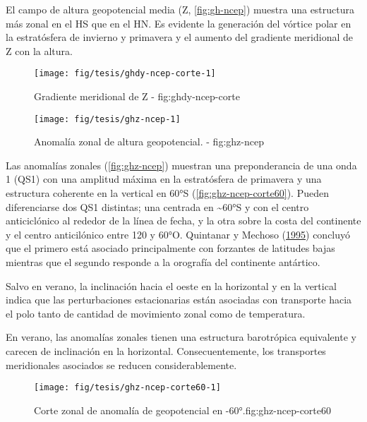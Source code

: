 \documentclass[spanish,a4paper]{book}
\begin{document}
El campo de altura geopotencial media (Z, \autoref{fig:gh-ncep}) muestra
una estructura más zonal en el HS que en el HN. Es evidente la
generación del vórtice polar en la estratósfera de invierno y primavera
y el aumento del gradiente meridional de Z con la altura.

\begin{figure}
\texttt{[image: fig/tesis/ghdy-ncep-corte-1]} \caption{Gradiente meridional de Z - fig:ghdy-ncep-corte}\label{fig:ghdy-ncep-corte}
\end{figure}

\begin{figure}

{\centering \texttt{[image: fig/tesis/ghz-ncep-1]} 

}

\caption{Anomalía zonal de altura geopotencial. - fig:ghz-ncep}\label{fig:ghz-ncep}
\end{figure}

Las anomalías zonales (\autoref{fig:ghz-ncep}) muestran una
preponderancia de una onda 1 (QS1) con una amplitud máxima en la
estratósfera de primavera y una estructura coherente en la vertical en
60°S (\autoref{fig:ghz-ncep-corte60}). Pueden diferenciarse dos QS1
distintas; una centrada en \textasciitilde{}60°S y con el centro
anticiclónico al rededor de la línea de fecha, y la otra sobre la costa
del continente y el centro anticilónico entre 120 y 60°O. Quintanar y
Mechoso (\protect\hyperlink{ref-Quintanar1995}{1995}) concluyó que el
primero está asociado principalmente con forzantes de latitudes bajas
mientras que el segundo responde a la orografía del continente
antártico.

Salvo en verano, la inclinación hacia el oeste en la horizontal y en la
vertical indica que las perturbaciones estacionarias están asociadas con
transporte hacia el polo tanto de cantidad de movimiento zonal como de
temperatura.

En verano, las anomalías zonales tienen una estructura barotrópica
equivalente y carecen de inclinación en la horizontal. Consecuentemente,
los transportes meridionales asociados se reducen considerablemente.

\begin{figure}

{\centering \texttt{[image: fig/tesis/ghz-ncep-corte60-1]} 

}

\caption{Corte zonal de anomalía de geopotencial en -60°.{fig:ghz-ncep-corte60}}\label{fig:ghz-ncep-corte60}
\end{figure}
\end{document}
